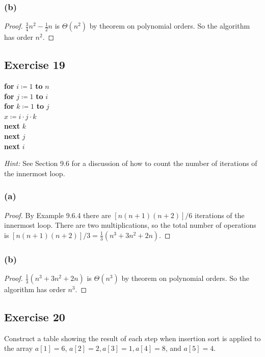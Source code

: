 \documentclass[14pt]{extarticle}
\begin{document}
\subsubsection{(b)}
\begin{proof}
\(\frac{3}{4}n^2 - \frac{1}{2}n\) is \(\Theta(n^2)\) by theorem on polynomial orders. So the algorithm has order 
\(n^2\).
\end{proof}

\subsection{Exercise 19}
\begin{tabbing}
{\bf for} \= \(i \coloneqq 1\) {\bf to} \(n\) \\
          \> {\bf for} \= \(j \coloneqq 1\) {\bf to} \(i\) \\
          \>           \> {\bf for} \= \(k \coloneqq 1\) {\bf to} \(j\) \\
          \>           \>           \> \(x \coloneqq i \cdot j \cdot k\) \\
          \>           \> {\bf next} \(k\) \\
          \> {\bf next} \(j\) \\
{\bf next} \(i\)
\end{tabbing}

{\it Hint:} See Section 9.6 for a discussion of how to count the number of iterations of the innermost loop.

\subsubsection{(a)}
\begin{proof}
By Example 9.6.4 there are \([n(n + 1)(n + 2)]/6\) iterations of the innermost loop. There are two multiplications, so the
total number of operations is \([n(n + 1)(n + 2)]/3 = \frac{1}{3}(n^3 + 3n^2 + 2n)\).
\end{proof}

\subsubsection{(b)}
\begin{proof}
\(\frac{1}{3}(n^3 + 3n^2 + 2n)\) is \(\Theta(n^3)\) by theorem on polynomial orders. So the algorithm has order \(n^3\).
\end{proof}

\subsection{Exercise 20}
Construct a table showing the result of each step when insertion sort is applied to the array \(a[1] = 6\), 
\(a[2] = 2, a[3] = 1, a[4] = 8\), and \(a[5] = 4\).
\end{document}
